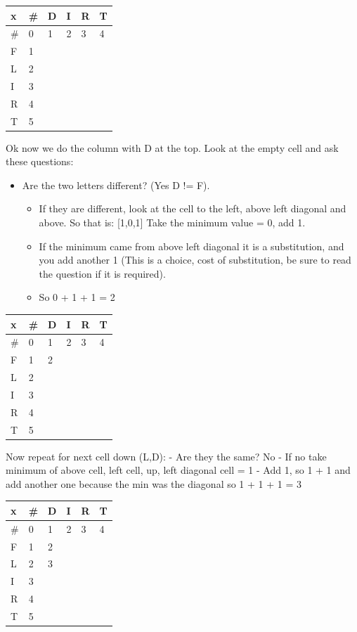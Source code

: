 \documentclass[
  11pt,
  british,
]{article}
\providecommand{\tightlist}{%
  \setlength{\itemsep}{0pt}\setlength{\parskip}{0pt}}
\begin{document}
\begin{longtable}[]{@{}llllll@{}}
\toprule
x & \# & D & I & R & T \\
\midrule
\endhead
\# & 0 & 1 & 2 & 3 & 4 \\
F & 1 & & & & \\
L & 2 & & & & \\
I & 3 & & & & \\
R & 4 & & & & \\
T & 5 & & & & \\
\bottomrule
\end{longtable}

Ok now we do the column with D at the top. Look at the empty cell and
ask these questions:

\begin{itemize}
\tightlist
\item
  Are the two letters different? (Yes D != F).

  \begin{itemize}
  \tightlist
  \item
    If they are different, look at the cell to the left, above left
    diagonal and above. So that is: {[}1,0,1{]} Take the minimum value =
    0, add 1.
  \item
    If the minimum came from above left diagonal it is a substitution,
    and you add another 1 (This is a choice, cost of substitution, be
    sure to read the question if it is required).
  \item
    So 0 + 1 + 1 = 2
  \end{itemize}
\end{itemize}

\begin{longtable}[]{@{}llllll@{}}
\toprule
x & \# & D & I & R & T \\
\midrule
\endhead
\# & 0 & 1 & 2 & 3 & 4 \\
F & 1 & 2 & & & \\
L & 2 & & & & \\
I & 3 & & & & \\
R & 4 & & & & \\
T & 5 & & & & \\
\bottomrule
\end{longtable}

Now repeat for next cell down (L,D): - Are they the same? No - If no
take minimum of above cell, left cell, up, left diagonal cell = 1 - Add
1, so 1 + 1 and add another one because the min was the diagonal so 1 +
1 + 1 = 3

\begin{longtable}[]{@{}llllll@{}}
\toprule
x & \# & D & I & R & T \\
\midrule
\endhead
\# & 0 & 1 & 2 & 3 & 4 \\
F & 1 & 2 & & & \\
L & 2 & 3 & & & \\
I & 3 & & & & \\
R & 4 & & & & \\
T & 5 & & & & \\
\bottomrule
\end{longtable}
\end{document}
